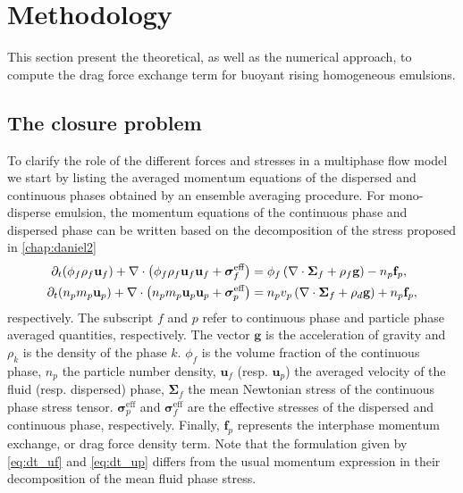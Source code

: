 \section{Methodology}
\label{sec:methodology_drag}
This section present the theoretical, as well as the numerical approach, to compute the drag force exchange term for buoyant rising homogeneous emulsions.

\subsection{The closure problem}
To clarify the role of the different forces and stresses in a multiphase flow model we start by listing the averaged momentum equations of the dispersed and continuous phases obtained by an ensemble averaging procedure.
For mono-disperse emulsion, the momentum equations of the continuous phase and dispersed phase can be written based on the decomposition of the stress proposed in \ref{chap:daniel2}
\begin{align}
    \pddt (\phi_f\rho_f \textbf{u}_f)
    + \div \left(\phi_f\rho_f \textbf{u}_f\textbf{u}_f + \bm{\sigma}_f^{\text{eff}}\right)
    &= \phi_f 
    \left(\div \bm{\Sigma}_f
    + \rho_f \textbf{g}\right)
    - n_p \textbf{f}_p, 
    \label{eq:dt_uf}
    \\
    \pddt (n_p  m_p  \textbf{u}_p)
    + \div \left(n_p m_p  \textbf{u}_p\textbf{u}_p
    +  \bm{\sigma}_p^{\text{eff}}\right)
    &= 
    n_p v_p \left(\div \bm{\Sigma}_f
    + \rho_d \textbf{g}\right)
    + n_p \textbf{f}_p, 
    \label{eq:dt_up}
\end{align}
respectively. 
The subscript $f$ and $p$ refer to continuous phase and particle phase averaged quantities, respectively.
The vector $\textbf{g}$ is the acceleration of gravity and $\rho_k$ is the density of the phase $k$. 
$\phi_f$ is the volume fraction of the continuous phase, $n_p$ the particle number density, $\textbf{u}_f$ (resp. $\textbf{u}_p$) the averaged velocity of the fluid (resp. dispersed) phase, $\bm{\Sigma}_f$ the mean Newtonian stress of the continuous phase stress tensor.
$\bm{\sigma}^{\text{eff}}_p$ and $\bm{\sigma}^{\text{eff}}_f$ are the effective stresses of the dispersed and continuous phase, respectively.  
Finally, $\textbf{f}_p$ represents the interphase momentum exchange, or drag force density term. 
Note that the formulation given by \ref{eq:dt_uf} and \ref{eq:dt_up} differs from the usual momentum expression \citep{wang2021numerical,wang2024effect} in their decomposition of the mean fluid phase stress. 

